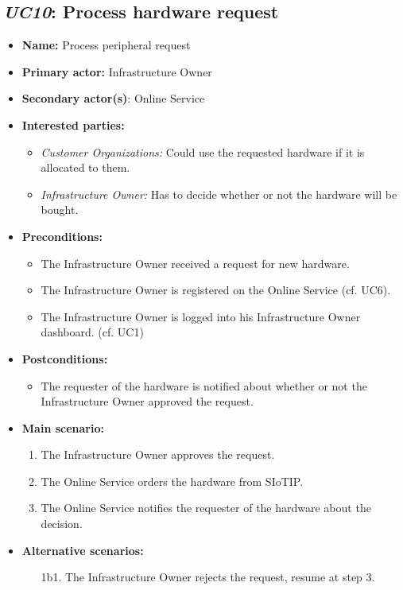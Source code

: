 \documentclass[english,peerreview]{sareport}
\begin{document}
\subsection{\emph{UC10}: Process hardware request}
\begin{itemize}
    \item \textbf{Name:} Process peripheral request
    \item \textbf{Primary actor:} Infrastructure Owner
    \item \textbf{Secondary actor(s)}: Online Service
    \item \textbf{Interested parties:} 
        \begin{itemize}
            \item \textit{Customer Organizations:} Could use the requested hardware if it is allocated to them.
            \item \textit{Infrastructure Owner:} Has to decide whether or not the hardware will be bought.
        \end{itemize}

    \item \textbf{Preconditions:}
        \begin{itemize}
            \item The Infrastructure Owner received a request for new hardware.
            \item The Infrastructure Owner is registered on the Online Service (cf. UC6).
            \item The Infrastructure Owner is logged into his Infrastructure Owner dashboard. (cf. UC1)
        \end{itemize}

    \item \textbf{Postconditions:}
        \begin{itemize}
            \item The requester of the hardware is notified about whether or not the Infrastructure Owner approved the request.
        \end{itemize}
        
    \item \textbf{Main scenario:} 
    \begin{enumerate}
       \item The Infrastructure Owner approves the request.
       \item The Online Service orders the hardware from SIoTIP.
       \item The Online Service notifies the requester of the hardware about the decision.
    \end{enumerate}

    \item \textbf{Alternative scenarios:} 
    \begin{enumerate}
        \item [1b1.] The Infrastructure Owner rejects the request, resume at step 3.
    \end{enumerate}
\end{itemize}
\end{document}
